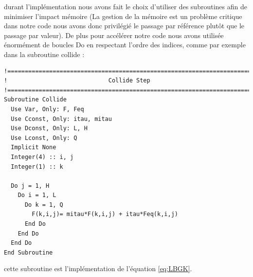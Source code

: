   durant l'implémentation nous avons fait le choix d'utiliser des subroutines afin de minimiser l'impact mémoire (La 
  gestion de la mémoire est un problème critique dans notre code nous avons donc privilégié le passage par référence 
  plutôt que le passage par valeur).
  De plus pour accélérer notre code nous avons utilisée énormément de boucles Do en respectant l'ordre des indices,
  comme par exemple dans la subroutine collide :
  \begin{verbatim}
!===============================================================================
!                             Collide Step
!===============================================================================
Subroutine Collide
  Use Var, Only: F, Feq
  Use Cconst, Only: itau, mitau
  Use Dconst, Only: L, H
  Use Lconst, Only: Q
  Implicit None
  Integer(4) :: i, j
  Integer(1) :: k
  
  Do j = 1, H
    Do i = 1, L
      Do k = 1, Q
        F(k,i,j)= mitau*F(k,i,j) + itau*Feq(k,i,j)
      End Do
    End Do
  End Do
End Subroutine
  \end{verbatim}
    cette subroutine est l'implémentation de l'équation \ref{eq:LBGK}.
  
  